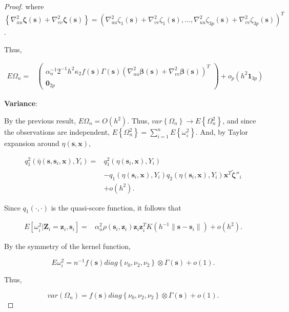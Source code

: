 \documentclass[12pt,english,authoryear, review]{article}\usepackage[]{graphicx}\usepackage[]{color}
\theoremstyle{plain}
\theoremstyle{plain}
\begin{document}
\begin{proof}
where $\left\{ \nabla_{uu}^{2}\bm{\zeta}\left(\bm{s}\right)+\nabla_{vv}^{2}\bm{\zeta}\left(\bm{s}\right)\right\} =\left(\nabla_{uu}^{2}\zeta_{1}\left(\bm{s}\right)+\nabla_{vv}^{2}\zeta_{1}\left(\bm{s}\right),\dots,\nabla_{uu}^{2}\zeta_{3p}\left(\bm{s}\right)+\nabla_{vv}^{2}\zeta_{3p}\left(\bm{s}\right)\right)^{T}$.

Thus,

\begin{align*}
E\Omega_{n}= & \left(\begin{array}{c}
\alpha_{n}^{-1}2^{-1}h^{2}\kappa_{2}f\left(\bm{s}\right)\Gamma\left(\bm{s}\right)\left(\nabla_{uu}^{2}\bm{\beta}\left(\bm{s}\right)+\nabla_{vv}^{2}\bm{\beta}\left(\bm{s}\right)\right)^{T}\\
\bm{0}_{2p}
\end{array}\right)+o_{p}\left(h^{2}\bm{1}_{3p}\right)
\end{align*}


\textbf{Variance}:

By the previous result, $E\Omega_{n}=O\left(h^{2}\right)$. Thus,
$var\left\{ \Omega_{n}\right\} \to E\left\{ \Omega_{n}^{2}\right\} $,
and since the observations are independent, $E\left\{ \Omega_{n}^{2}\right\} =\sum_{i=1}^{n}E\left\{ \omega_{i}^{2}\right\} $.
And, by Taylor expansion around $\eta\left(\bm{s},\bm{x}\right)$, 

\begin{align*}
q_{1}^{2}\left(\bar{\eta}\left(\bm{s},\bm{s}_{i},\bm{x}\right),Y_{i}\right)= & q_{1}^{2}\left(\eta\left(\bm{s}_{i},\bm{x}\right),Y_{i}\right)\\
 & -q_{1}\left(\eta\left(\bm{s}_{i},\bm{x}\right),Y_{i}\right)q_{2}\left(\eta\left(\bm{s}_{i},\bm{x}\right),Y_{i}\right)\bm{x}^{T}\tilde{\bm{\zeta}}''_{i}\\
 & +o\left(h^{2}\right).
\end{align*}


Since $q_{1}\left(\cdot,\cdot\right)$ is the quasi-score function,
it follows that 

\begin{align*}
E\left[\omega_{i}^{2}|\bm{Z}_{i}=\bm{z}_{i},\bm{s}_{i}\right]= & \alpha_{n}^{2}\rho\left(\bm{s}_{i},\bm{z}_{i}\right)\bm{z}_{i}\bm{z}_{i}^{T}K\left(h^{-1}\|\bm{s}-\bm{s}_{i}\|\right)+o\left(h^{2}\right).
\end{align*}


By the symmetry of the kernel function,

\[
E\omega_{i}^{2}=n^{-1}f\left(\bm{s}\right)diag\left\{ \nu_{0},\nu_{2},\nu_{2}\right\} \otimes\Gamma\left(\bm{s}\right)+o\left(1\right).
\]


Thus, 

\[
var\left(\Omega_{n}\right)=f\left(\bm{s}\right)diag\left\{ \nu_{0},\nu_{2},\nu_{2}\right\} \otimes\Gamma\left(\bm{s}\right)+o\left(1\right).
\]

\end{proof}
\end{document}
